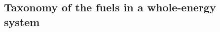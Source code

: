 \documentclass[a4paper,twoside,10pt,final]{memoir} %
\begin{document}








\begin{appendices}

\chapter{Taxonomy of the fuels in a whole-energy system}
\label{app:Taxonomy}


%
%
%
%
%



\end{appendices}
\end{document}
